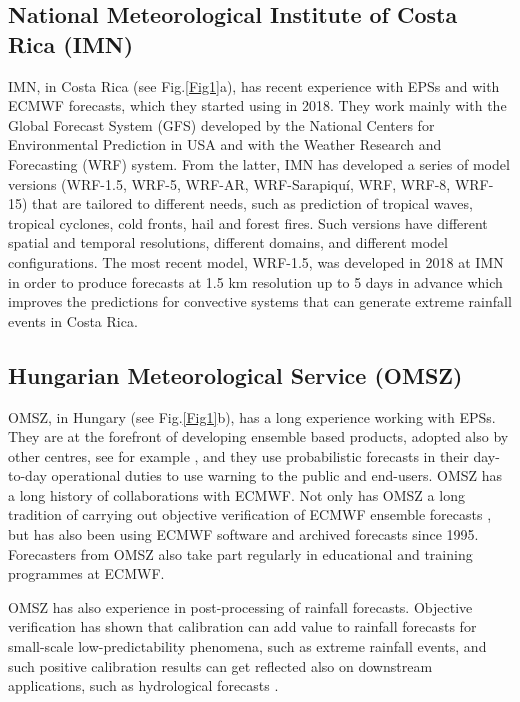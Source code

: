 \documentclass[twocol]{ametsocV5} %
\begin{document}
\subsection{National Meteorological Institute of Costa Rica (IMN)} 
IMN, in Costa Rica (see Fig.\ref{Fig1}a), has recent experience with EPSs and with ECMWF forecasts, which they started using in 2018. They work mainly with the Global Forecast System (GFS) developed by the National Centers for Environmental Prediction in USA and with the Weather Research and Forecasting (WRF) system. From the latter, IMN has developed a series of model versions (WRF-1.5, WRF-5, WRF-AR, WRF-Sarapiquí, WRF, WRF-8, WRF-15) that are tailored to different needs, such as prediction of tropical waves, tropical cyclones, cold fronts, hail and forest fires. Such versions have different spatial and temporal resolutions, different domains, and different model configurations. The most recent model, WRF-1.5, was developed in 2018 at IMN in order to produce forecasts at 1.5 km resolution up to 5 days in advance which improves the predictions for convective systems that can generate extreme rainfall events in Costa Rica. 


\subsection{Hungarian Meteorological Service (OMSZ)}
OMSZ, in Hungary (see Fig.\ref{Fig1}b), has a long experience working with EPSs. They are at the forefront of developing ensemble based products, adopted also by other centres, see for example \citet{Gascon2018}, and they use probabilistic forecasts in their day-to-day operational duties to use warning to the public and end-users. OMSZ has a long history of collaborations with ECMWF. Not only has OMSZ a long tradition of carrying out objective verification of ECMWF ensemble forecasts \citep{Hewson2020}, but has also been using ECMWF software and archived forecasts since 1995. Forecasters from OMSZ also take part regularly in educational and training programmes at ECMWF. \par
OMSZ has also experience in post-processing of rainfall forecasts. Objective verification has shown that calibration can add value to rainfall forecasts for small-scale low-predictability phenomena, such as extreme rainfall events, and such positive calibration results can get reflected also on downstream applications, such as hydrological forecasts \citep{Ihasz2018,Matrai2017}.


\end{document}
